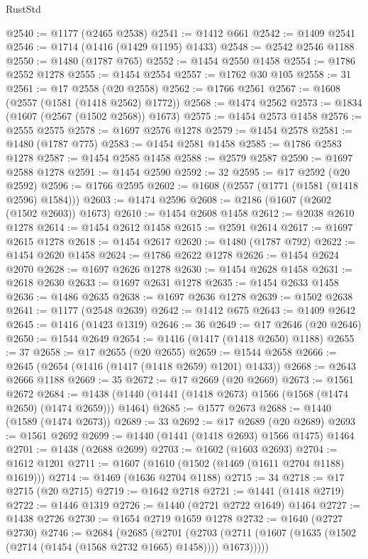 \begin{lexlean}{RustStd}
\begin{coremodule}
@2540 := @1177 (@2465 @2538)
@2541 := @1412 @661
@2542 := @1409 @2541
@2546 := @1714 (@1416 (@1429 @1195) @1433)
@2548 := @2542 @2546 @1188
@2550 := @1480 (@1787 @765)
@2552 := @1454 @2550 @1458
@2554 := @1786 @2552 @1278
@2555 := @1454 @2554
@2557 := @1762 @30 @105
@2558 := 31
@2561 := @17 @2558 (@20 @2558)
@2562 := @1766 @2561
@2567 := @1608 (@2557 (@1581 (@1418 @2562) @1772))
@2568 := @1474 @2562
@2573 := @1834 (@1607 (@2567 (@1502 @2568)) @1673)
@2575 := @1454 @2573 @1458
@2576 := @2555 @2575
@2578 := @1697 @2576 @1278
@2579 := @1454 @2578
@2581 := @1480 (@1787 @775)
@2583 := @1454 @2581 @1458
@2585 := @1786 @2583 @1278
@2587 := @1454 @2585 @1458
@2588 := @2579 @2587
@2590 := @1697 @2588 @1278
@2591 := @1454 @2590
@2592 := 32
@2595 := @17 @2592 (@20 @2592)
@2596 := @1766 @2595
@2602 := @1608 (@2557 (@1771 (@1581 (@1418 @2596) @1584)))
@2603 := @1474 @2596
@2608 := @2186 (@1607 (@2602 (@1502 @2603)) @1673)
@2610 := @1454 @2608 @1458
@2612 := @2038 @2610 @1278
@2614 := @1454 @2612 @1458
@2615 := @2591 @2614
@2617 := @1697 @2615 @1278
@2618 := @1454 @2617
@2620 := @1480 (@1787 @792)
@2622 := @1454 @2620 @1458
@2624 := @1786 @2622 @1278
@2626 := @1454 @2624 @2070
@2628 := @1697 @2626 @1278
@2630 := @1454 @2628 @1458
@2631 := @2618 @2630
@2633 := @1697 @2631 @1278
@2635 := @1454 @2633 @1458
@2636 := @1486 @2635
@2638 := @1697 @2636 @1278
@2639 := @1502 @2638
@2641 := @1177 (@2548 @2639)
@2642 := @1412 @675
@2643 := @1409 @2642
@2645 := @1416 (@1423 @1319)
@2646 := 36
@2649 := @17 @2646 (@20 @2646)
@2650 := @1544 @2649
@2654 := @1416 (@1417 (@1418 @2650) @1188)
@2655 := 37
@2658 := @17 @2655 (@20 @2655)
@2659 := @1544 @2658
@2666 := @2645 (@2654 (@1416 (@1417 (@1418 @2659) @1201) @1433))
@2668 := @2643 @2666 @1188
@2669 := 35
@2672 := @17 @2669 (@20 @2669)
@2673 := @1561 @2672
@2684 := @1438 (@1440 (@1441 (@1418 @2673) @1566 (@1568 (@1474 @2650) (@1474 @2659))) @1464)
@2685 := @1577 @2673
@2688 := @1440 (@1589 (@1474 @2673))
@2689 := 33
@2692 := @17 @2689 (@20 @2689)
@2693 := @1561 @2692
@2699 := @1440 (@1441 (@1418 @2693) @1566 @1475) @1464
@2701 := @1438 (@2688 @2699)
@2703 := @1602 (@1603 @2693)
@2704 := @1612 @1201
@2711 := @1607 (@1610 (@1502 (@1469 (@1611 @2704 @1188) @1619)))
@2714 := @1469 (@1636 @2704 @1188)
@2715 := 34
@2718 := @17 @2715 (@20 @2715)
@2719 := @1642 @2718
@2721 := @1441 (@1418 @2719)
@2722 := @1446 @1319
@2726 := @1440 (@2721 @2722 @1649) @1464
@2727 := @1438 @2726
@2730 := @1654 @2719 @1659 @1278
@2732 := @1640 (@2727 @2730)
@2746 := @2684
    (@2685
      (@2701
        (@2703 (@2711 (@1607 (@1635 (@1502 (@2714 (@1454 (@1568 @2732 @1665) @1458)))) @1673)))))

\end{coremodule}
\end{lexlean}

